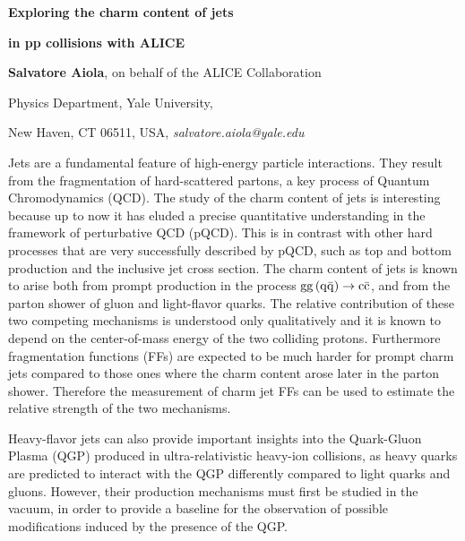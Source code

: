 \documentclass[12pt]{article}
\begin{document}
\centerline{\bf 
Exploring the charm content of jets
}

\centerline{\bf 
in pp collisions with ALICE
}

\vspace{12pt}

\centerline{ {\bf Salvatore Aiola}, on behalf of the ALICE Collaboration }

\vspace{12pt}

\centerline{Physics Department, Yale University,
}\centerline{New Haven, CT 06511, USA, {\it salvatore.aiola@yale.edu}}

\vspace{12pt}


\vspace{12pt} \vspace{12pt}

Jets are a fundamental feature of high-energy particle interactions. 
They result from the fragmentation of hard-scattered partons, 
a key process of Quantum Chromodynamics (QCD). 
The study of the charm content of jets is interesting because up to now
it has eluded a precise quantitative understanding in the framework of perturbative
QCD (pQCD). This is in contrast with other hard processes that are very successfully described
by pQCD, such as top and bottom production and the inclusive jet cross section.
The charm content of jets is known to arise both from prompt production in the process ${\rm gg\, (q\bar{q})} \rightarrow {\rm c\bar{c}}$, and
from the parton shower of gluon and light-flavor quarks.
The relative contribution of these two competing mechanisms is understood only qualitatively
and it is known to depend on the center-of-mass energy of the two colliding protons.
Furthermore fragmentation functions (FFs) are expected to be much harder
for prompt charm jets compared to those ones where the charm content arose later in the
parton shower. Therefore the measurement of charm jet FFs can be used to estimate
the relative strength of the two mechanisms.

Heavy-flavor jets can also provide important insights into the Quark-Gluon Plasma (QGP)
produced in ultra-relativistic heavy-ion collisions, as heavy quarks are predicted
to interact with the QGP differently compared to light quarks and gluons. 
However, their production mechanisms must first be studied in the vacuum, 
in order to provide a baseline for the observation of possible modifications induced by the presence of the QGP. 
\end{document}

